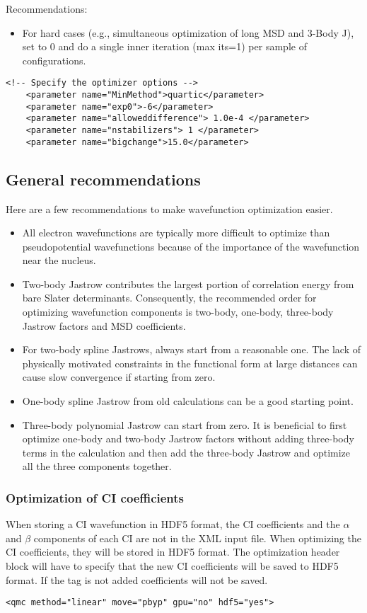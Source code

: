 Recommendations:
\begin{itemize}
  \item{For hard cases (e.g., simultaneous optimization of long MSD and 3-Body J), set 
to 0 and do a single inner iteration (max its=1) per sample of configurations.}
\end{itemize}

\begin{lstlisting}[style=QMCPXML]
    <!-- Specify the optimizer options -->
    <parameter name="MinMethod">quartic</parameter>
    <parameter name="exp0">-6</parameter>
    <parameter name="alloweddifference"> 1.0e-4 </parameter>
    <parameter name="nstabilizers"> 1 </parameter>
    <parameter name="bigchange">15.0</parameter>
\end{lstlisting}

\subsection{General recommendations}
Here are a few recommendations to make wavefunction optimization easier.
\begin{itemize}
\item All electron wavefunctions are typically more difficult to optimize than pseudopotential wavefunctions because of the importance of the wavefunction near the nucleus.
\item Two-body Jastrow contributes the largest portion of correlation energy from bare Slater determinants. Consequently, the recommended order for optimizing wavefunction components is two-body, one-body, three-body Jastrow factors and MSD coefficients.
\item For two-body spline Jastrows, always start from a reasonable one. The lack of physically motivated constraints in the functional form at large distances can cause slow convergence if starting from zero. 
\item One-body spline Jastrow from old calculations can be a good starting point.
\item Three-body polynomial Jastrow can start from zero. It is beneficial to first optimize one-body and two-body Jastrow factors without adding three-body terms in the calculation and then add the three-body Jastrow and optimize all the three components together.
\end{itemize}
\subsubsection{Optimization of CI coefficients}
When storing a CI wavefunction in HDF5 format, the CI coefficients and the $\alpha$ and $\beta$ components of each CI are not in the XML input file. When optimizing the CI coefficients, they will be stored in HDF5 format. 
The optimization header block will have to specify that the new CI coefficients will be saved to HDF5 format. If the tag is not added coefficients will not be saved. 
\begin{lstlisting}[style=QMCPXML]
  <qmc method="linear" move="pbyp" gpu="no" hdf5="yes">
\end{lstlisting}

